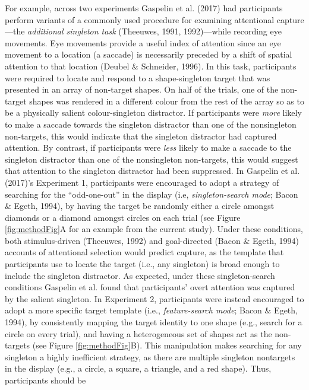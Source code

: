 \documentclass[man, a4paper, noextraspace, 11pt,floatsintext]{apa6}
\begin{document}
For example, across two experiments Gaspelin et al. (2017) had
participants perform variants of a commonly used procedure for examining
attentional capture---the \emph{additional singleton task} (Theeuwes,
1991, 1992)---while recording eye movements. Eye movements provide a
useful index of attention since an eye movement to a location (a
saccade) is necessarily preceded by a shift of spatial attention to that
location (Deubel \& Schneider, 1996). In this task, participants were
required to locate and respond to a shape-singleton target that was
presented in an array of non-target shapes. On half of the trials, one
of the non-target shapes was rendered in a different colour from the
rest of the array so as to be a physically salient colour-singleton
distractor. If participants were \emph{more} likely to make a saccade
towards the singleton distractor than one of the nonsingleton
non-targets, this would indicate that the singleton distractor had
captured attention. By contrast, if participants were \emph{less} likely
to make a saccade to the singleton distractor than one of the
nonsingleton non-targets, this would suggest that attention to the
singleton distractor had been suppressed. In Gaspelin et al. (2017)'s
Experiment 1, participants were encouraged to adopt a strategy of
searching for the \enquote{odd-one-out} in the display (i.e,
\emph{singleton-search mode}; Bacon \& Egeth, 1994), by having the
target be randomly either a circle amongst diamonds or a diamond amongst
circles on each trial (see Figure \ref{fig:methodFig}A for an example
from the current study). Under these conditions, both stimulus-driven
(Theeuwes, 1992) and goal-directed (Bacon \& Egeth, 1994) accounts of
attentional selection would predict capture, as the template that
participants use to locate the target (i.e., any singleton) is broad
enough to include the singleton distractor. As expected, under these
singleton-search conditions Gaspelin et al. found that participants'
overt attention was captured by the salient singleton. In Experiment 2,
participants were instead encouraged to adopt a more specific target
template (i.e., \emph{feature-search mode}; Bacon \& Egeth, 1994), by
consistently mapping the target identity to one shape (e.g., search for
a circle on every trial), and having a heterogeneous set of shapes act
as the non-targets (see Figure \ref{fig:methodFig}B). This manipulation
makes searching for any singleton a highly inefficient strategy, as
there are multiple singleton nontargets in the display (e.g., a circle,
a square, a triangle, and a red shape). Thus, participants should be
\end{document}
